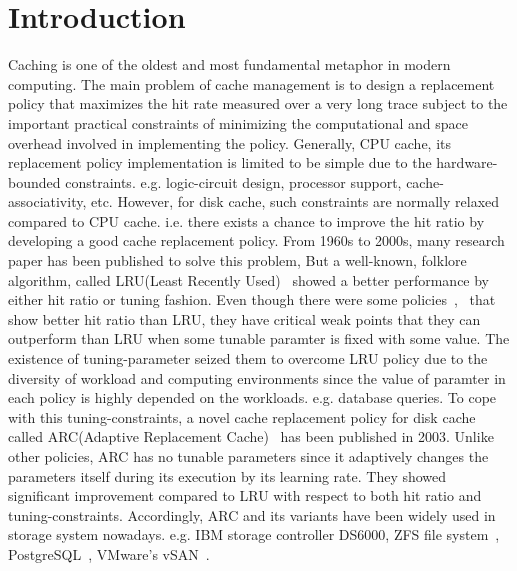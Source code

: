 \section{Introduction}
Caching is one of the oldest and most fundamental metaphor in modern computing. The main problem of cache management is to design a replacement policy that maximizes the hit rate measured over a very long trace subject to the important practical constraints of minimizing the computational and space overhead involved in implementing the policy. Generally, CPU cache, its replacement policy implementation is limited to be simple due to the hardware-bounded constraints. e.g. logic-circuit design, processor support, cache-associativity, etc. However, for disk cache, such constraints are normally relaxed compared to CPU cache. i.e. there exists a chance to improve the hit ratio by developing a good cache replacement policy. From 1960s to 2000s, many research paper has been published to solve this problem, But a well-known, folklore algorithm, called LRU(Least Recently Used)~\cite{lru} showed a better performance by either hit ratio or tuning fashion. Even though there were some policies~\cite{lrfu},~\cite{mq} that show better hit ratio than LRU, they have critical weak points that they can outperform than LRU when some tunable paramter is fixed with some value. The existence of tuning-parameter seized them to overcome LRU policy due to the diversity of workload and computing environments since the value of paramter in each policy is highly depended on the workloads. e.g. database queries. 
To cope with this tuning-constraints, a novel cache replacement policy for disk cache called ARC(Adaptive Replacement Cache)~\cite{arc} has been published in 2003. Unlike other policies, ARC has no tunable parameters since it adaptively changes the parameters itself during its execution by its learning rate. They showed significant improvement compared to LRU with respect to both hit ratio and tuning-constraints. Accordingly, ARC and its variants have been widely used in storage system nowadays. e.g. IBM storage controller DS6000, ZFS file system~\cite{zfs}, PostgreSQL~\cite{postgresql}, VMware's vSAN~\cite{vsan}. 

